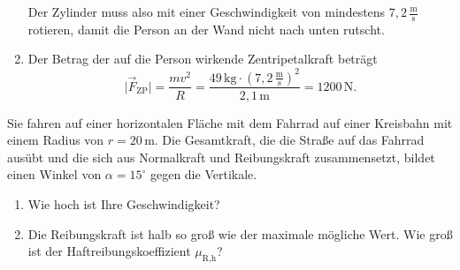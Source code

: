 \begin{MExercises}
\begin{MExercise}
\begin{MSolution}
\begin{enumerate}
\begin{equation}
   \end{equation}
   Der Zylinder muss also mit einer Geschwindigkeit von mindestens $7{,}2\,\frac{\text{m}}{\text{s}}$ rotieren, damit die Person an der Wand nicht nach unten rutscht.
   \item Der Betrag der auf die Person wirkende Zentripetalkraft betr\"agt
   \begin{equation*}
   \vert\vec{F}_{\textrm{ZP}}\vert=\frac{mv^2}{R}=\frac{49\,\text{kg}\cdot (7,2\,\frac{\text{m}}{\text{s}})^2}{2{,}1\,\text{m}}=1200\,\text{N.}
   \end{equation*}
   
   \end{enumerate}
   \end{MSolution}
   \end{MExercise}
    
  \begin{MExercise}
  Sie fahren auf einer horizontalen Fl\"ache mit dem Fahrrad auf einer Kreisbahn mit einem Radius von $r=20\,\text{m}$. Die Gesamtkraft, die die Stra{\ss}e auf das Fahrrad aus\"ubt und die sich aus Normalkraft und Reibungskraft zusammensetzt, bildet einen Winkel von $\alpha=15^{\circ}$ gegen die Vertikale. 
  \begin{enumerate}
  \item Wie hoch ist Ihre Geschwindigkeit?
  \item Die Reibungskraft ist halb so gro{\ss} wie der maximale m\"ogliche Wert. Wie gro{\ss} ist der Haftreibungskoeffizient $\mu_{\textrm{R,h}}$?
  \end{enumerate}
  
  
  
 
  

\end{MExercise}
\end{MExercises}
